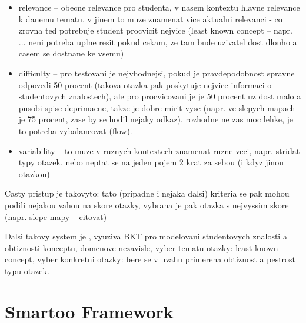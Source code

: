 \documentclass[a4paper, 12pt, twoside]{fithesis2}		%
\renewcommand{\_}{\leavevmode \kern0.0em\vbox{\hrule width0.4em}}
\newcommand{\squarebullet}{\textcolor{black}{\raisebox{0.15em}{\rule{4pt}{4pt}}}}
\newenvironment{myItemize}{
  \begin{itemize}[leftmargin=2em,rightmargin=1em,itemsep=\parskip ,parsep=0em,topsep=0em,partopsep=0em]
  \renewcommand{\labelitemi}{\squarebullet}
  \renewcommand{\labelitemii}{$\diamond$}
}{
  \end{itemize}
}
\begin{document}
\begin{myItemize}
  \item relevance -- obecne relevance pro studenta, v nasem kontextu hlavne relevance k danemu tematu, v jinem to muze znamenat vice aktualni relevanci - co zrovna ted potrebuje student procvicit nejvice (least known concept -- napr. \cite{question-gen-adapt-bayes} ... neni potreba uplne resit pokud cekam, ze tam bude uzivatel dost dlouho a casem se dostnane ke vsemu)
  \item difficulty -- pro testovani je nejvhodnejsi, pokud je pravdepodobnost spravne odpovedi 50 procent (takova otazka pak poskytuje nejvice informaci o studentovych znalostech), ale pro procvicovani je je 50 procent uz dost malo a pusobi spise deprimacne, takze je dobre mirit vyse (napr. ve slepych mapach je 75 procent, zase by se hodil nejaky odkaz), rozhodne ne zas moc lehke, je to potreba vybalancovat (flow).
  \item variability -- to muze v ruznych kontextech znamenat ruzne veci, napr. stridat typy otazek, nebo neptat se na jeden pojem 2 krat za sebou (i kdyz jinou otazkou)
\end{myItemize}

Casty pristup je takovyto: tato (pripadne i nejaka dalsi) kriteria se pak mohou podili nejakou vahou na skore otazky, vybrana je pak otazka s nejvyssim skore (napr. slepe mapy -- citovat)

Dalsi takovy system je
\cite{question-gen-adapt-bayes}, vyuziva BKT pro modelovani studentovych znalosti a obtiznosti konceptu,  domenove nezavisle, vyber tematu otazky: least known concept, vyber konkretni otazky: bere se v uvahu primerena obtiznost a pestrost typu otazek.




\chapter{Smartoo Framework}
\label{chap:smartoo}
\end{document}
